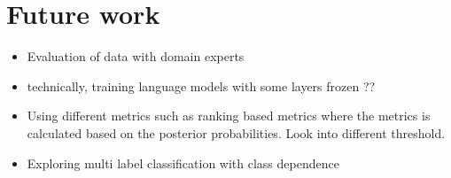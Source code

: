 \section{Future work}
\begin{itemize}
    \item Evaluation of data with domain experts
    \item technically, training language models with some layers frozen ??
    \item Using different metrics such as ranking based metrics where the metrics is calculated based on the posterior probabilities. Look into different threshold.
    \item Exploring multi label classification with class dependence
\end{itemize}